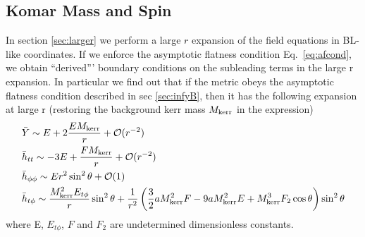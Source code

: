 \documentclass[aps,prd,amsmath,showpacs,amssymb,superscriptaddress,nofootinbib,longbibliography,eqsecnum,preprintnumbers]{revtex4-1}
\newcommand{\zach}[1]{\textcolor{ForestGreen}{#1}}
\begin{document}
\subsection{Komar Mass and Spin}
In section \ref{sec:larger} we perform a large $r$ expansion of the field equations in BL-like coordinates. If we enforce the asymptotic flatness condition Eq.~\eqref{eq:afcond}, we obtain ``derived''' boundary conditions on the subleading terms in the large r expansion. In particular we find out that if the metric obeys the asymptotic flatness condition described in sec \ref{sec:infyB}, then it has the following expansion at large r (restoring the background kerr mass $M_{\rm kerr}$ in the expression)
\begin{align}
&\bar Y \sim E +2\frac{EM_{\rm kerr}}{r}+\mathcal{O}(r^{-2}) \nonumber \\
&\bar h_{tt} \sim -3E +\frac{FM_{\rm kerr}}{r}+\mathcal{O}(r^{-2}) \nonumber \\
&\bar h_{\phi\phi}\sim Er^2\sin^2\theta  +\mathcal{O}(1) \nonumber \\
&\bar h_{t\phi}\sim \frac{ M_{\rm kerr}^2 E_{t\phi}}{r}\sin^2\theta+\frac{1}{r^2} \left( \frac{3}{2}aM_{\rm kerr}^2F-9aM_{\rm kerr}^2E+M_{\rm kerr}^3F_2 \cos\theta \right)\sin^2\theta
\label{eq:largersum}
\end{align}
where E, $E_{t\phi}$, $F$ and $F_2$ are undetermined dimensionless constants. 

\end{document}
